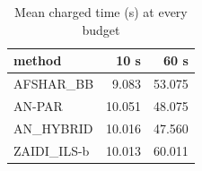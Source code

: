 \begin{table}[htbp]
\centering
\small
\caption{Mean charged time (s) at every budget}
\label{tab:state_of_the_art_10s_to_60s_time_by_budget}
\begin{tabular}{lrr}
\toprule
method & 10 s & 60 s \\
\midrule
AFSHAR\_BB & 9.083 & 53.075 \\
AN-PAR & 10.051 & 48.075 \\
AN\_HYBRID & 10.016 & 47.560 \\
ZAIDI\_ILS-b & 10.013 & 60.011 \\
\bottomrule
\end{tabular}
\end{table}
